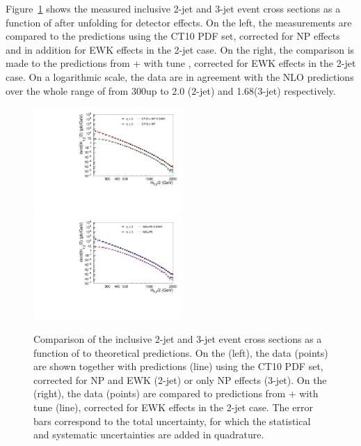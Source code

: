Figure~\ref{fig:data_NL0_MC} shows the measured inclusive 2-jet and
3-jet event cross sections as a function of \httwo after unfolding for
detector effects. On the left, the measurements are compared to the
\NLOJETPP predictions using the CT10 PDF set, corrected for NP effects
and in addition for EWK effects in the 2-jet case.  On the right, the
comparison is made to the predictions from \MadGraphF + \PYTHIAS with
tune \Ztwostar, corrected for EWK effects in the 2-jet case. On a
logarithmic scale, the data are in agreement with the NLO predictions
over the whole range of \httwo from 300\GeV up to 2.0 (2-jet) and 1.68\TeV (3-jet) respectively.

\begin{figure}[!htbp]
  \includegraphics[width=0.50\textwidth]{Plots_HT_2_150/Comparison_data_theory_EWK.pdf}%
  \includegraphics[width=0.50\textwidth]{Plots_HT_2_150/Comparison_data_MC_EWK.pdf}\\
  \caption{Comparison of the inclusive 2-jet and 3-jet event cross
    sections as a function of \httwo to theoretical predictions. On
    the (left), the data (points) are shown together with
    \NLOJETPP predictions (line) using the CT10 PDF set, corrected for
    NP and EWK (2-jet) or only NP effects (3-jet).  On the
    (right), the data (points) are compared to predictions from
    \MadGraphF + \PYTHIAS with tune \Ztwostar (line), corrected for
    EWK effects in the 2-jet case. The error bars correspond to the
    total uncertainty, for which the statistical and systematic
    uncertainties are added in quadrature.}
  \label{fig:data_NL0_MC}
\end{figure}

